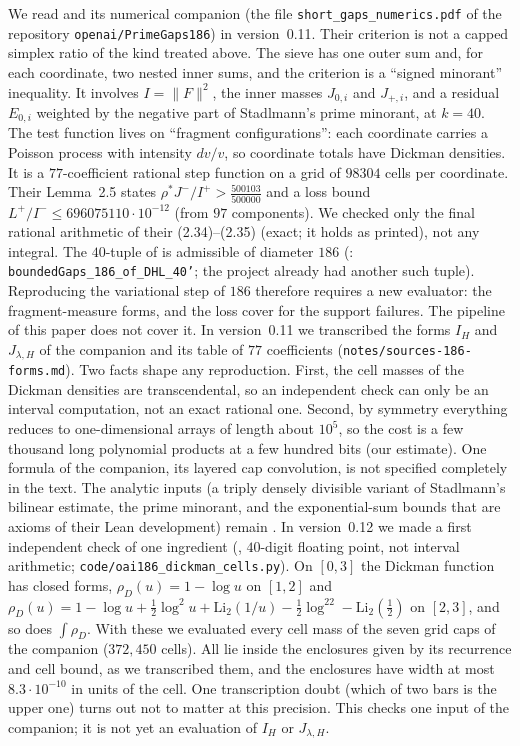 \begin{remark}\label{rem:oai186}
We read \cite{OAI26} and its numerical companion (the file
\texttt{short\_gaps\_numerics.pdf} of the repository \texttt{openai/PrimeGaps186}) in version~0.11.
Their criterion is not a capped simplex ratio of the kind treated above.
The sieve has one outer sum and, for each coordinate, two nested inner sums,
and the criterion \cite[Theorem~4.5]{OAI26} is a ``signed minorant''
inequality. It involves $I=\|F\|^2$, the inner masses
$J_{0,i}$ and $J_{+,i}$, and a residual $E_{0,i}$ weighted by the negative
part of Stadlmann's prime minorant, at $k=40$.
The test function lives on ``fragment configurations'': each coordinate carries
a Poisson process with intensity $dv/v$, so coordinate totals have Dickman
densities. It is a $77$-coefficient rational step function on a grid of
$98304$ cells per coordinate. Their Lemma~2.5 states
$\rho^*J^-/I^+>\frac{500103}{500000}$ and a loss bound
$L^+/I^-\le 696075110\cdot10^{-12}$ (from $97$ components). We checked only the
final rational arithmetic of their (2.34)--(2.35) (exact; it holds as printed),
not any integral. The $40$-tuple of \cite[(1.3)]{OAI26} is admissible of diameter
$186$ (: \texttt{boundedGaps\_186\_of\_DHL\_40'}; the project
already had another such tuple). Reproducing the variational step of $186$ therefore
requires a new evaluator: the fragment-measure forms, and the loss cover for the
support failures. The pipeline of this paper does not cover it. In version~0.11
we transcribed the forms $I_H$ and $J_{\lambda,H}$ of the companion and its
table of $77$ coefficients (\texttt{notes/sources-186-forms.md}). Two facts
shape any reproduction. First, the cell masses of the Dickman densities are
transcendental, so an independent check can only be an interval computation, not an
exact rational one. Second, by symmetry everything reduces to one-dimensional
arrays of length about $10^5$, so the cost is a few thousand long polynomial
products at a few hundred bits (our estimate). One formula of the companion,
its layered cap convolution, is not specified completely in the text.
The analytic inputs (a triply densely divisible variant of Stadlmann's
bilinear estimate, the prime minorant, and the exponential-sum bounds that are
axioms of their Lean development) remain .
In version~0.12 we made a first independent check of one ingredient
(, $40$-digit floating point, not interval arithmetic;
\texttt{code/oai186\_dickman\_cells.py}). On $[0,3]$ the Dickman function has
closed forms, $\rho_D(u)=1-\log u$ on $[1,2]$ and
$\rho_D(u)=1-\log u+\frac12\log^2u+\mathrm{Li}_2(1/u)-\frac12\log^22-\mathrm{Li}_2(\frac12)$
on $[2,3]$, and so does $\int\rho_D$. With these we evaluated every cell mass of the seven grid caps
of the companion ($372{,}450$ cells). All lie inside the enclosures given by
its recurrence and cell bound, as we transcribed them, and the enclosures have
width at most $8.3\cdot10^{-10}$ in units of the cell. One transcription doubt
(which of two bars is the upper one) turns out not to matter at this precision.
This checks one input of the companion; it is not yet an evaluation of
$I_H$ or $J_{\lambda,H}$.
\end{remark}

